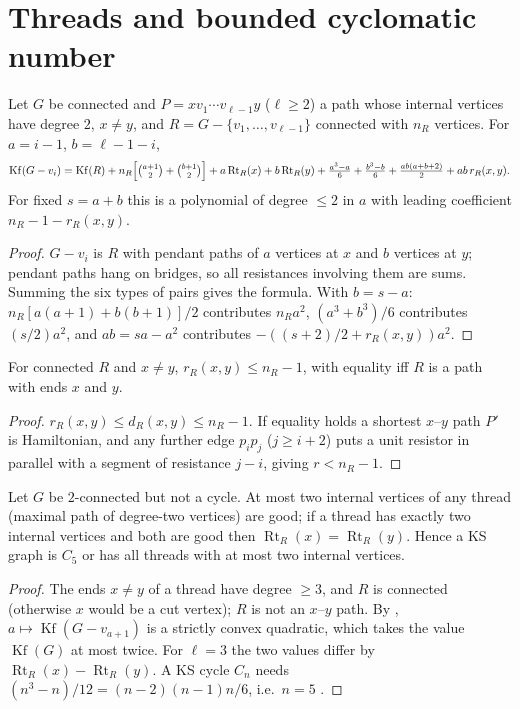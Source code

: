 \documentclass[11pt,a4paper]{report}
\newcommand{\Kf}{\operatorname{Kf}}
\newcommand{\Rt}{\operatorname{Rt}}
\begin{document}
\section{Threads and bounded cyclomatic number}
\begin{lemma}[note=thread formula]\label{lem:thread}
Let $G$ be connected and $P=xv_1\cdots v_{\ell-1}y$ ($\ell\ge2$) a path whose internal vertices have degree
$2$, $x\ne y$, and $R=G-\{v_1,\dots,v_{\ell-1}\}$ connected with $n_R$ vertices. For $a=i-1$, $b=\ell-1-i$,
\[
\Kf(G-v_i)=\Kf(R)+n_R\Bigl[\tbinom{a+1}{2}+\tbinom{b+1}{2}\Bigr]+a\Rt_R(x)+b\Rt_R(y)+\tfrac{a^3-a}{6}
+\tfrac{b^3-b}{6}+\tfrac{ab(a+b+2)}{2}+ab\,r_R(x,y).
\]
For fixed $s=a+b$ this is a polynomial of degree $\le2$ in $a$ with leading coefficient $n_R-1-r_R(x,y)$.
\end{lemma}
\begin{proof}
$G-v_i$ is $R$ with pendant paths of $a$ vertices at $x$ and $b$ vertices at $y$; pendant paths hang on
bridges, so all resistances involving them are sums. Summing the six types of pairs gives the formula.
With $b=s-a$: $n_R[a(a+1)+b(b+1)]/2$ contributes $n_Ra^2$, $(a^3+b^3)/6$ contributes $(s/2)a^2$, and
$ab=sa-a^2$ contributes $-((s+2)/2+r_R(x,y))a^2$.
\end{proof}
\begin{lemma}\label{lem:rpath}
For connected $R$ and $x\ne y$, $r_R(x,y)\le n_R-1$, with equality iff $R$ is a path with ends $x$ and $y$.
\end{lemma}
\begin{proof}
$r_R(x,y)\le d_R(x,y)\le n_R-1$. If equality holds a shortest $x$--$y$ path $P'$ is Hamiltonian, and any
further edge $p_ip_j$ ($j\ge i+2$) puts a unit resistor in parallel with a segment of resistance $j-i$,
giving $r<n_R-1$.
\end{proof}
\begin{corollary}\label{cor:thread}
Let $G$ be $2$-connected but not a cycle. At most two internal vertices of any thread (maximal path of
degree-two vertices) are good; if a thread has exactly two internal vertices and both are good then
$\Rt_R(x)=\Rt_R(y)$. Hence a KS graph is $C_5$ or has all threads with at most two internal vertices.
\end{corollary}
\begin{proof}
The ends $x\ne y$ of a thread have degree $\ge3$, and $R$ is connected (otherwise $x$ would be a cut vertex);
$R$ is not an $x$--$y$ path. By , $a\mapsto\Kf(G-v_{a+1})$ is a strictly convex
quadratic, which takes the value $\Kf(G)$ at most twice. For $\ell=3$ the two values differ by
$\Rt_R(x)-\Rt_R(y)$. A KS cycle $C_n$ needs $(n^3-n)/12=(n-2)(n-1)n/6$, i.e.\ $n=5$ \autocite{GMD26}.
\end{proof}
\end{document}

